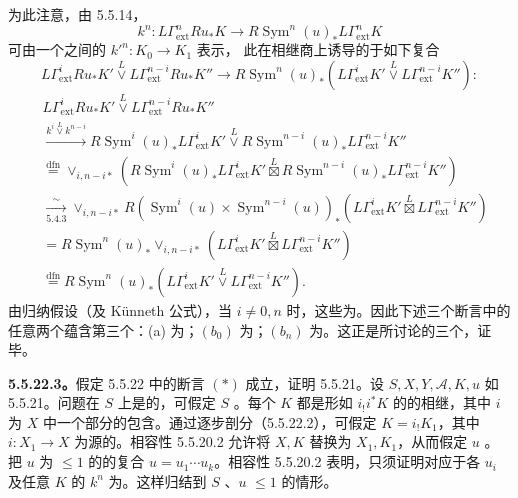 为此注意，由 5.5.14，
\begin{equation}\tag{a}k^n:L\Gamma^n_{\mathrm{ext}}Ru_*K\longrightarrow R\operatorname{Sym}^n(u)_*L\Gamma^n_{\mathrm{ext}}K\end{equation}
可由一个之间的 $k'^n:K_0\to K_1$ 表示，
此在相继商上诱导的于如下复合
\begin{equation}\tag{$b_i$}L\Gamma^i_{\mathrm{ext}}Ru_*K'\overset L\vee L\Gamma^{n-i}_{\mathrm{ext}}Ru_*K''\longrightarrow R\operatorname{Sym}^n(u)_*(L\Gamma^i_{\mathrm{ext}}K'\overset L\vee L\Gamma^{n-i}_{\mathrm{ext}}K''):\end{equation}
\[\begin{aligned}
{}&L\Gamma^i_{\mathrm{ext}}Ru_*K'\overset L\vee L\Gamma^{n-i}_{\mathrm{ext}}Ru_*K''\\
&\xrightarrow{k^i\overset L\vee k^{n-i}}R\operatorname{Sym}^i(u)_*L\Gamma^i_{\mathrm{ext}}K'\overset L\vee R\operatorname{Sym}^{n-i}(u)_*L\Gamma^{n-i}_{\mathrm{ext}}K''\\
&\overset{\mathrm{dfn}}=\vee_{i,n-i*}(R\operatorname{Sym}^i(u)_*L\Gamma^i_{\mathrm{ext}}K'\overset L\boxtimes R\operatorname{Sym}^{n-i}(u)_*L\Gamma^{n-i}_{\mathrm{ext}}K'')\\
&\xrightarrow[5.4.3]{\sim}\vee_{i,n-i*}R(\operatorname{Sym}^i(u)\times\operatorname{Sym}^{n-i}(u))_*(L\Gamma^i_{\mathrm{ext}}K'\overset L\boxtimes L\Gamma^{n-i}_{\mathrm{ext}}K'')\\
&=R\operatorname{Sym}^n(u)_*\vee_{i,n-i*}(L\Gamma^i_{\mathrm{ext}}K'\overset L\boxtimes L\Gamma^{n-i}_{\mathrm{ext}}K'')\\
&\overset{\mathrm{dfn}}=R\operatorname{Sym}^n(u)_*(L\Gamma^i_{\mathrm{ext}}K'\overset L\vee L\Gamma^{n-i}_{\mathrm{ext}}K'').
\end{aligned}\]
由归纳假设（及 Künneth 公式），当 $i\ne0,n$ 时，这些为。因此下述三个断言中的任意两个蕴含第三个：(a) 为；$(b_0)$ 为；$(b_n)$ 为。这正是所讨论的三个，证毕。

\textbf{5.5.22.3。}假定 5.5.22 中的断言 $(*)$ 成立，证明 5.5.21。设 $S,X,Y,\mathscr A,K,u$ 如 5.5.21。问题在 $S$ 上是的，可假定 $S$ 。每个 $K$ 都是形如 $i_!i^*K$ 的的相继，其中 $i$ 为 $X$ 中一个部分的包含。通过逐步剖分（5.5.22.2），可假定 $K=i_!K_1$，其中 $i:X_1\to X$ 为源的。相容性 5.5.20.2 允许将 $X,K$ 替换为 $X_1,K_1$，从而假定 $u$ 。把 $u$ 为 $\leq1$ 的的复合 $u=u_1\cdots u_k$。相容性 5.5.20.2 表明，只须证明对应于各 $u_i$ 及任意 $K$ 的 $k^n$ 为。这样归结到 $S$ 、$u$  $\leq1$ 的情形。

